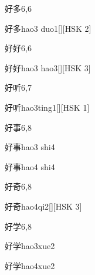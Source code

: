 \begin{entry}{好多}{6,6}
  \begin{phonetics}{好多}{hao3 duo1}[][HSK 2]
  \end{phonetics}
\end{entry}

\begin{entry}{好好}{6,6}
  \begin{phonetics}{好好}{hao3 hao3}[][HSK 3]
  \end{phonetics}
\end{entry}

\begin{entry}{好听}{6,7}
  \begin{phonetics}{好听}{hao3ting1}[][HSK 1]
  \end{phonetics}
\end{entry}

\begin{entry}{好事}{6,8}
  \begin{phonetics}{好事}{hao3 shi4}
  \end{phonetics}
  \begin{phonetics}{好事}{hao4 shi4}
  \end{phonetics}
\end{entry}

\begin{entry}{好奇}{6,8}
  \begin{phonetics}{好奇}{hao4qi2}[][HSK 3]
  \end{phonetics}
\end{entry}

\begin{entry}{好学}{6,8}
  \begin{phonetics}{好学}{hao3xue2}
  \end{phonetics}
  \begin{phonetics}{好学}{hao4xue2}
  \end{phonetics}
\end{entry}

